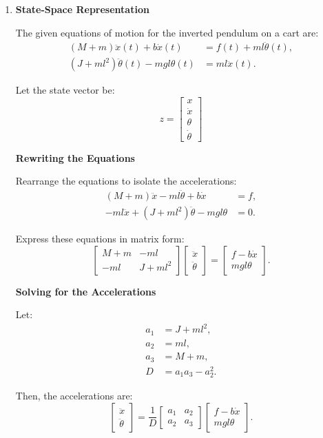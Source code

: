 \documentclass{article}
\begin{document}
\begin{enumerate}
    \item[(a)] \textbf{State-Space Representation}

    The given equations of motion for the inverted pendulum on a cart are:
    \begin{align*}
    (M + m) \ddot{x}(t) + b \dot{x}(t) &= f(t) + m l \ddot{\theta}(t), \\
    (J + m l^2) \ddot{\theta}(t) - m g l \theta(t) &= m l \ddot{x}(t).
    \end{align*}

    Let the state vector be:
    \[
    z = \begin{bmatrix} x \\ \dot{x} \\ \theta \\ \dot{\theta} \end{bmatrix}
    \]

    \textbf{Rewriting the Equations}

    Rearrange the equations to isolate the accelerations:
    \begin{align*}
    (M + m) \ddot{x} - m l \ddot{\theta} + b \dot{x} &= f, \\
    -m l \ddot{x} + (J + m l^2) \ddot{\theta} - m g l \theta &= 0.
    \end{align*}

    Express these equations in matrix form:
    \[
    \begin{bmatrix}
    M + m & -m l \\
    -m l & J + m l^2
    \end{bmatrix}
    \begin{bmatrix}
    \ddot{x} \\
    \ddot{\theta}
    \end{bmatrix}
    =
    \begin{bmatrix}
    f - b \dot{x} \\
    m g l \theta
    \end{bmatrix}.
    \]

    \textbf{Solving for the Accelerations}

    Let:
    \begin{align*}
    a_1 &= J + m l^2, \\
    a_2 &= m l, \\
    a_3 &= M + m, \\
    D &= a_1 a_3 - a_2^2.
    \end{align*}

    Then, the accelerations are:
    \[
    \begin{bmatrix}
    \ddot{x} \\
    \ddot{\theta}
    \end{bmatrix}
    =
    \frac{1}{D}
    \begin{bmatrix}
    a_1 & a_2 \\
    a_2 & a_3
    \end{bmatrix}
    \begin{bmatrix}
    f - b \dot{x} \\
    m g l \theta
    \end{bmatrix}.
    \]


\end{enumerate}
\end{document}

